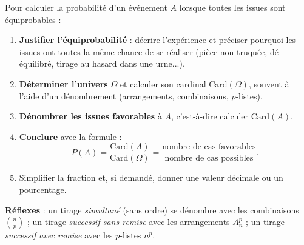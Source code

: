 \documentclass[11pt]{article}
\begin{document}
\begin{methode}
Pour calculer la probabilité d'un événement $A$ lorsque toutes les issues sont équiprobables :
\begin{enumerate}
\item \textbf{Justifier l'équiprobabilité} : décrire l'expérience et préciser pourquoi les issues ont toutes la même chance de se réaliser (pièce non truquée, dé équilibré, tirage au hasard dans une urne...).
\item \textbf{Déterminer l'univers} $\Omega$ et calculer son cardinal $\text{Card}(\Omega)$, souvent à l'aide d'un dénombrement (arrangements, combinaisons, $p$-listes).
\item \textbf{Dénombrer les issues favorables} à $A$, c'est-à-dire calculer $\text{Card}(A)$.
\item \textbf{Conclure} avec la formule :
\[ P(A) = \frac{\text{Card}(A)}{\text{Card}(\Omega)} = \frac{\text{nombre de cas favorables}}{\text{nombre de cas possibles}}. \]
\item Simplifier la fraction et, si demandé, donner une valeur décimale ou un pourcentage.
\end{enumerate}
\textbf{Réflexes} : un tirage \emph{simultané} (sans ordre) se dénombre avec les combinaisons $\binom{n}{p}$ ; un tirage \emph{successif sans remise} avec les arrangements $A_n^p$ ; un tirage \emph{successif avec remise} avec les $p$-listes $n^p$.
\end{methode}
\end{document}
